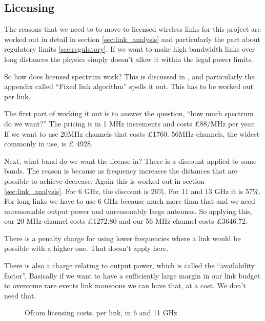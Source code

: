 \subsection{Licensing}

The reasons that we need to to move to licensed wireless links for
this project are worked out in detail in section
\ref{sec:link_analysis} and particularly the part about regulatory
limits \ref{sec:regulatory}. If we want to make high bandwidth links
over long distances the physics simply doesn't allow it within the
legal power limits.

So how does licensed spectrum work? This is discussed in
\cite{OfcomSpectrum}, and particularly the appendix called ``Fixed
link algorithm'' spells it out. This has to be worked out per link.

The first part of working it out is to answer the question, ``how much
spectrum do we want?'' The pricing is in 1 MHz increments and costs
£88/MHz per year. If we want to use 20MHz channels that costs
\pounds 1760. 56MHz channels, the widest commonly in use, is \pounds 
4928.

Next, what band do we want the license in? There is a discount applied
to some bands. The reason is because as frequency increases the
distances that are possible to achieve decrease. Again this is worked
out in section \ref{sec:link_analysis}. For 6 GHz, the discount is
26\%. For 11 and 13 GHz it is 57\%. For long links we have to use 6
GHz because much more than that and we need unreasonable output power
and unreasonably large antennas. So applying this, our 20 MHz channel
costs \pounds 1272.80 and our 56 MHz channel costs \pounds 3646.72.

There is a penalty charge for using lower frequencies where a link
would be possible with a higher one. That doesn't apply here.

There is also a charge relating to output power, which is called the
``availability factor''. Basically if we want to have a sufficiently
large margin in our link budget to overcome rare events link monsoons
we can have that, at a cost. We don't need that.

\begin{figure}[h]
  \begin{center}
    
  \end{center}
  \caption{Ofcom licensing costs, per link, in 6 and 11 GHz}
  \label{fig:license_costs}
\end{figure}
